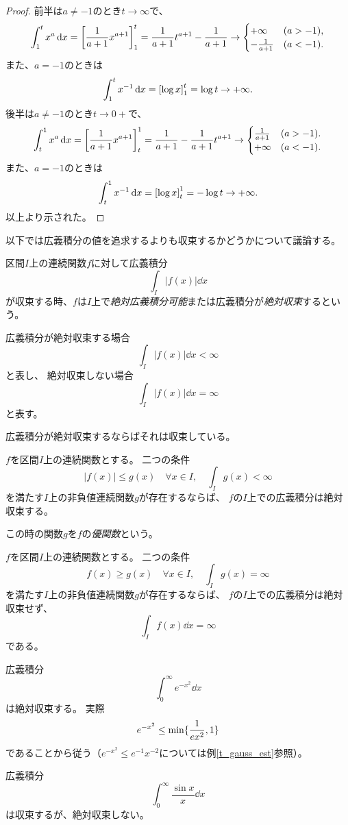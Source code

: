 \begin{proof}
前半は$a \ne -1$のとき$t \to \infty$で、
$$
\int_1^t x^a\dd{x} = \lreval*{\frac{1}{a+1}x^{a+1}}_1^t = \frac{1}{a+1}t^{a+1}-\frac{1}{a+1} \to
\begin{cases}
+\infty & (a > -1), \\
-\frac{1}{a+1} & (a < -1).
\end{cases}
$$
また、$a = -1$のときは
$$
\int_1^t x^{-1}\dd{x} = \lreval*{\log x}_1^t = \log t \to +\infty.
$$
後半は$a \ne -1$のとき$t \to 0+$で、
$$
\int_t^1 x^a\dd{x} = \lreval*{\frac{1}{a+1}x^{a+1}}_t^1 = \frac{1}{a+1}-\frac{1}{a+1}t^{a+1} \to
\begin{cases}
\frac{1}{a+1} & (a > -1). \\
+\infty & (a < -1).
\end{cases}
$$
また、$a = -1$のときは
$$
\int_t^1 x^{-1}\dd{x} = \lreval*{\log x}_t^1 = -\log t \to +\infty.
$$
以上より示された。
\end{proof}

以下では広義積分の値を追求するよりも収束するかどうかについて議論する。

\begin{definition}[広義積分の絶対収束]
区間$I$上の連続関数$f$に対して広義積分
$$
\int_I |f(x)|\dd{x}
$$
が収束する時、$f$は$I$上で\emph{絶対広義積分可能}または広義積分が\emph{絶対収束}するという。
\end{definition}

\begin{remark}
広義積分が絶対収束する場合
$$
\int_I |f(x)|\dd{x} < \infty
$$
と表し、
絶対収束しない場合
$$
\int_I |f(x)|\dd{x} = \infty
$$
と表す。
\end{remark}

\begin{remark}
広義積分が絶対収束するならばそれは収束している。
\end{remark}

\begin{proposition}[広義積分の比較判定法１]
$f$を区間$I$上の連続関数とする。
二つの条件
$$
|f(x)| \le g(x) \quad \forall x \in I,
\quad \int_I g(x) < \infty
$$
を満たす$I$上の非負値連続関数$g$が存在するならば、
$f$の$I$上での広義積分は絶対収束する。
\end{proposition}

\begin{remark}
この時の関数$g$を$f$の\emph{優関数}という。
\end{remark}

\begin{proposition}[広義積分の比較判定法２]
$f$を区間$I$上の連続関数とする。
二つの条件
$$
f(x) \ge g(x) \quad \forall x \in I,
\quad \int_I g(x) = \infty
$$
を満たす$I$上の非負値連続関数$g$が存在するならば、
$f$の$I$上での広義積分は絶対収束せず、
$$
\int_I f(x)\dd{x} = \infty
$$
である。
\end{proposition}

\begin{example}
広義積分
$$
\int_0^\infty e^{-x^2}\dd{x}
$$
は絶対収束する。
実際
$$
e^{-x^2} \le \min\lrset{ \frac{1}{e x^2}, 1 }
$$
であることから従う（$e^{-x^2} \le e^{-1}x^{-2}$については例\ref{t_gauss_est}参照）。
\end{example}

\begin{example}
広義積分
$$
\int_0^\infty \frac{\sin x}{x}\dd{x}
$$
は収束するが、絶対収束しない。
\end{example}
